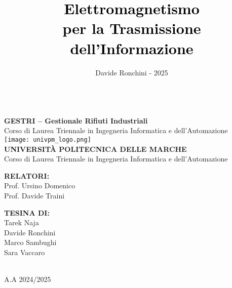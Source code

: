 \documentclass[a4paper]{report}
\title{\huge \textbf{\textcolor{black}{Elettromagnetismo\\per la Trasmissione dell'Informazione}}\\}
\author{Davide Ronchini - 2025}
\date{}
\begin{document}
\thispagestyle{empty} %


\begin{center}
    \vphantom{space} \\[0.5cm]
    {\Large \textbf{\textcolor{myGreen}{GESTRI – Gestionale Rifiuti Industriali}}}\\[0.3cm]
    
    {\normalsize Corso di Laurea Triennale in Ingegneria Informatica e dell’Automazione}\\[2cm]
    
    \texttt{[image: univpm\_logo.png]}\\[2cm]
    
    {\large \textbf{\textcolor{myGreen}{UNIVERSITÀ POLITECNICA DELLE MARCHE}}}\\ [0.3cm]
    {\normalsize Corso di Laurea Triennale in Ingegneria Informatica e dell’Automazione}\\[2cm]
    
    \begin{minipage}{0.45\textwidth}
        \begin{flushleft}
        \textbf{\textcolor{myGreen}{RELATORI:}}\\[0.2cm]
        Prof. Ursino Domenico\\
        Prof. Davide Traini
        \end{flushleft}
    \end{minipage}
    \hfill
    \begin{minipage}{0.45\textwidth}
        \begin{flushright}
        \textbf{\textcolor{myGreen}{TESINA DI:}}\\[0.2cm]
        Tarek Naja \\
        Davide Ronchini\\
        Marco Sambughi \\
        Sara Vaccaro
        \end{flushright}
    \end{minipage}\\[5.5cm]
    
    {\normalsize A.A 2024/2025}
\end{center}
\end{document}
